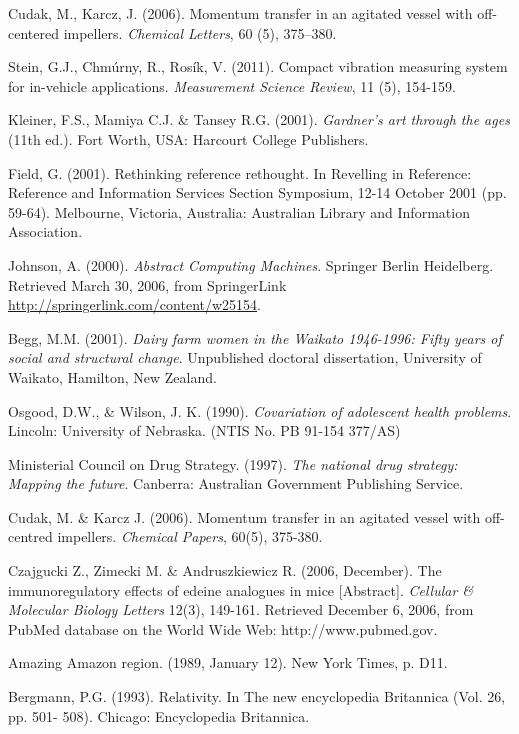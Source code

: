\documentclass[english]{MSRarticle}
\begin{document}
\begin{thebibliography}{00}

Cudak, M., Karcz, J. (2006). 
\newblock Momentum transfer in an agitated vessel with off-centered impellers. 
\newblock \emph{Chemical Letters}, 60 (5), 375--380. 

\balance 


Stein, G.J., Chm{\'u}rny, R., Rosík, V. (2011). Compact vibration measuring system for in-vehicle applications. \emph{Measurement Science Review}, 11 (5), 154-159.

Kleiner, F.S., Mamiya C.J. \& Tansey R.G. (2001). \emph{Gardner's art through the ages} (11th ed.). Fort Worth, USA: Harcourt College Publishers.

Field, G. (2001). Rethinking reference rethought. In Revelling in Reference: Reference and Information Services Section Symposium, 12-14 October 2001 (pp. 59-64). Melbourne, Victoria, Australia: Australian Library and Information Association.

Johnson,  A.  (2000).  \emph{Abstract Computing  Machines}. Springer   Berlin  Heidelberg.   Retrieved   March   30, 2006, from SpringerLink \url{http://springerlink.com/content/w25154}.

Begg, M.M. (2001). \emph{Dairy farm women in the Waikato 1946-1996: Fifty years of social and structural change}. Unpublished doctoral dissertation, University of Waikato, Hamilton, New Zealand.

Osgood, D.W., \& Wilson, J. K. (1990). \emph{Covariation of adolescent health problems}. Lincoln: University of Nebraska. (NTIS No. PB 91-154 377/AS)

Ministerial Council on Drug Strategy. (1997). \emph{The national drug strategy: Mapping the future}. Canberra: Australian Government Publishing Service.

Cudak, M. \& Karcz J. (2006). Momentum transfer in an agitated vessel with off-centred impellers. \emph{Chemical Papers}, 60(5), 375-380.

Czajgucki Z., Zimecki M. \& Andruszkiewicz R. (2006, December). The immunoregulatory effects of edeine analogues in mice [Abstract]. \emph{Cellular \& Molecular Biology Letters} 12(3), 149-161. Retrieved December 6, 2006,  from PubMed database on the World Wide Web: http://www.pubmed.gov.

Amazing Amazon region. (1989, January 12). New York Times, p. D11.

Bergmann, P.G. (1993). Relativity. In The new encyclopedia Britannica (Vol. 26, pp. 501- 508). Chicago: Encyclopedia Britannica.

\end{thebibliography}
\end{document}
